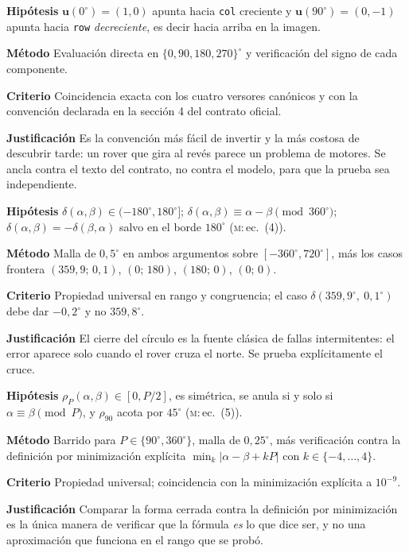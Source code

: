 \documentclass[11pt,a4paper]{article}
\newcommand{\uu}{\mathbf{u}}
\newcommand{\grados}{^{\circ}}
\newenvironment{prueba}[2]{%
  \par\medskip\noindent
  \begin{tcolorbox}[enhanced,breakable,colback=white,colframe=black!45,
    boxrule=0.5pt,arc=1pt,left=6pt,right=6pt,top=4pt,bottom=4pt,
    title={\bfseries #1\quad\normalfont #2},
    colbacktitle=black!8,coltitle=black,fonttitle=\bfseries\small]
  \small
}{\end{tcolorbox}\par\medskip}
\newcommand{\campo}[1]{\par\smallskip\noindent\textbf{#1}\quad\ignorespaces}
\begin{document}
\begin{prueba}{N0.5}{Convención de pantalla (fila descendente)}
\campo{Hipótesis} $\uu(0\grados) = (1,0)$ apunta hacia \texttt{col} creciente y
$\uu(90\grados) = (0,-1)$ apunta hacia \texttt{row} \emph{decreciente}, es decir hacia
arriba en la imagen.
\campo{Método} Evaluación directa en $\{0,90,180,270\}\grados$ y verificación del signo
de cada componente.
\campo{Criterio} Coincidencia exacta con los cuatro versores canónicos y con la
convención declarada en la sección 4 del contrato oficial.
\campo{Justificación} Es la convención más fácil de invertir y la más costosa de
descubrir tarde: un rover que gira al revés parece un problema de motores. Se ancla
contra el texto del contrato, no contra el modelo, para que la prueba sea
independiente.
\end{prueba}

\begin{prueba}{N0.6}{Diferencia angular con signo}
\campo{Hipótesis} $\delta(\alpha,\beta) \in (-180\grados, 180\grados]$;
$\delta(\alpha,\beta) \equiv \alpha-\beta \pmod{360\grados}$;
$\delta(\alpha,\beta) = -\delta(\beta,\alpha)$ salvo en el borde $180\grados$
(\textsc{m}:\,ec.~(4)).
\campo{Método} Malla de $0{,}5\grados$ en ambos argumentos sobre
$[-360\grados, 720\grados]$, más los casos frontera $(359{,}9;\,0{,}1)$,
$(0;\,180)$, $(180;\,0)$, $(0;\,0)$.
\campo{Criterio} Propiedad universal en rango y congruencia; el caso
$\delta(359{,}9\grados,\ 0{,}1\grados)$ debe dar $-0{,}2\grados$ y no $359{,}8\grados$.
\campo{Justificación} El cierre del círculo es la fuente clásica de fallas
intermitentes: el error aparece solo cuando el rover cruza el norte. Se prueba
explícitamente el cruce.
\end{prueba}

\begin{prueba}{N0.7}{Distancia angular de periodo $P$}
\campo{Hipótesis} $\rho_P(\alpha,\beta) \in [0, P/2]$, es simétrica, se anula si y solo
si $\alpha\equiv\beta \pmod P$, y $\rho_{90}$ acota por $45\grados$ (\textsc{m}:\,ec.~(5)).
\campo{Método} Barrido para $P\in\{90\grados, 360\grados\}$, malla de $0{,}25\grados$,
más verificación contra la definición por minimización explícita
$\min_{k}|\alpha-\beta+kP|$ con $k \in \{-4,\dots,4\}$.
\campo{Criterio} Propiedad universal; coincidencia con la minimización explícita a
$10^{-9}$.
\campo{Justificación} Comparar la forma cerrada contra la definición por minimización
es la única manera de verificar que la fórmula \emph{es} lo que dice ser, y no una
aproximación que funciona en el rango que se probó.
\end{prueba}
\end{document}
